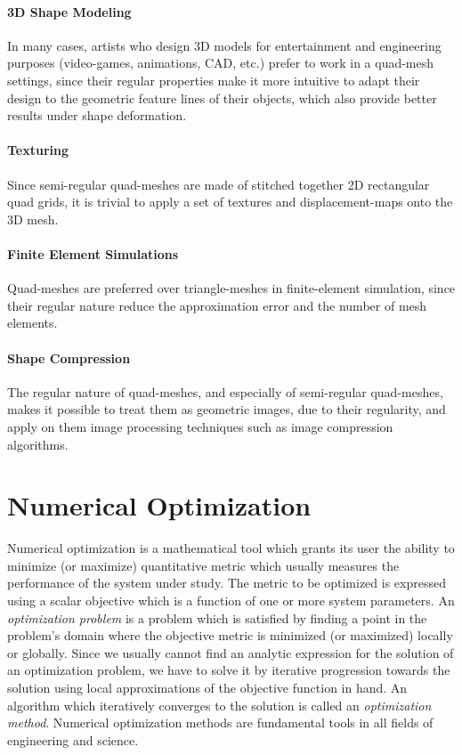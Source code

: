 \paragraph{3D Shape Modeling} In many cases, artists who design 3D models for entertainment and engineering purposes (video-games, animations, CAD, etc.) prefer to work in a quad-mesh settings, since their regular properties make it more intuitive to adapt their design to the geometric feature lines of their objects, which also provide better results under shape deformation.
\paragraph{Texturing} Since semi-regular quad-meshes are made of stitched together 2D rectangular quad grids, it is trivial to apply a set of textures and displacement-maps onto the 3D mesh.
\paragraph{Finite Element Simulations} Quad-meshes are preferred over triangle-meshes in finite-element simulation, since their regular nature reduce the approximation error and the number of mesh elements.
\paragraph{Shape Compression} The regular nature of quad-meshes, and especially of semi-regular quad-meshes, makes it possible to treat them as geometric images, due to their regularity, and apply on them image processing techniques such as image compression algorithms.
\section{Numerical Optimization}
Numerical optimization is a mathematical tool which grants its user the ability to minimize (or maximize) quantitative metric which usually measures the performance of the system under study. The metric to be optimized is expressed using a scalar objective which is a function of one or more system parameters. An \emph{optimization problem} is a problem which is satisfied by finding a point in the problem's domain where the objective metric is minimized (or maximized) locally or globally. Since we usually cannot find an analytic expression for the solution of an optimization problem, we have to solve it by iterative progression towards the solution using local approximations of the objective function in hand. An algorithm which iteratively converges to the solution is called an \emph{optimization method}. Numerical optimization methods are fundamental tools in all fields of engineering and science.

